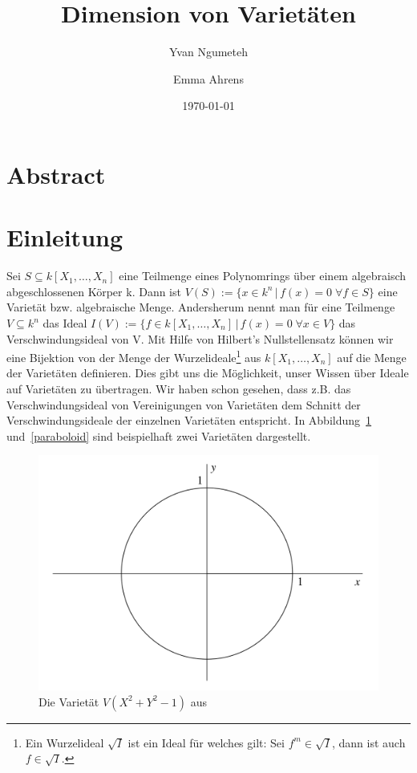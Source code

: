 \documentclass{article}
\title{Dimension von Varietäten}
\date{\today}
\author{Yvan Ngumeteh \and Emma Ahrens}
\newcommand*{\R}{k[X_{1},\ldots,X_{n}]}
\begin{document}
\maketitle

\section{Abstract}
\section{Einleitung}
	
	Sei \(S \subseteq \R\) eine Teilmenge eines Polynomrings über einem algebraisch abgeschlossenen
	Körper k. Dann ist \(V(S) := \{x \in k^n\,|\, f(x)=0\; \forall f \in S\}\) eine Varietät bzw.
	algebraische Menge. Andersherum nennt man für eine Teilmenge \(V \subseteq k^{n}\) das 
	Ideal \(I(V) := \{f \in \R\,|\, f(x)=0\; \forall x\in V\}\) das Verschwindungsideal von V.
	Mit Hilfe von Hilbert's Nullstellensatz können wir eine Bijektion von
	der Menge der Wurzelideale\footnote{Ein Wurzelideal \(\sqrt{I}\) ist ein Ideal für welches gilt: Sei \(f^{m} \in \sqrt{I}\), dann ist auch \(f \in \sqrt{I}\).} aus \(\R\) auf die Menge der Varietäten definieren. Dies gibt uns
	die Möglichkeit, unser Wissen über Ideale auf Varietäten zu übertragen. Wir haben schon
	gesehen, dass z.B. das Verschwindungsideal von Vereinigungen von Varietäten dem Schnitt der
	Verschwindungsideale der einzelnen Varietäten entspricht.
	In Abbildung~\ref{circle} und~\ref{paraboloid} sind beispielhaft zwei Varietäten dargestellt.

	\begin{figure}[ht]
		\centering
		\includegraphics[width=.75\linewidth]{circle.png}
		\caption{Die Varietät \(V(X^2 + Y^2 -1)\) aus \cite{CLOS}}
		\label{circle}
	\end{figure}
\end{document}
